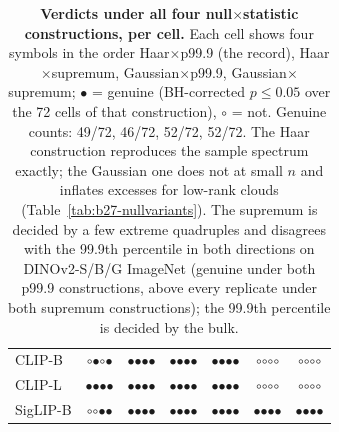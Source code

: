 \begin{table}[H]
\begin{tabular}{lcccccc}
\midrule
CLIP-B & $\circ$$\bullet$$\circ$$\bullet$ & $\bullet$$\bullet$$\bullet$$\bullet$ & $\bullet$$\bullet$$\bullet$$\bullet$ & $\bullet$$\bullet$$\bullet$$\bullet$ & $\circ$$\circ$$\circ$$\circ$ & $\circ$$\circ$$\circ$$\circ$ \\
CLIP-L & $\bullet$$\bullet$$\bullet$$\bullet$ & $\bullet$$\bullet$$\bullet$$\bullet$ & $\bullet$$\bullet$$\bullet$$\bullet$ & $\bullet$$\bullet$$\bullet$$\bullet$ & $\circ$$\circ$$\circ$$\circ$ & $\circ$$\circ$$\circ$$\circ$ \\
SigLIP-B & $\circ$$\circ$$\bullet$$\bullet$ & $\bullet$$\bullet$$\bullet$$\bullet$ & $\bullet$$\bullet$$\bullet$$\bullet$ & $\bullet$$\bullet$$\bullet$$\bullet$ & $\bullet$$\bullet$$\bullet$$\bullet$ & $\bullet$$\bullet$$\bullet$$\bullet$ \\
\bottomrule
\end{tabular}
\caption{\textbf{Verdicts under all four null$\times$statistic constructions, per cell.} Each cell shows four symbols in the order Haar$\times$p99.9 (the record), Haar$\times$supremum, Gaussian$\times$p99.9, Gaussian$\times$supremum; $\bullet$ = genuine (BH-corrected $p\le0.05$ over the 72 cells of that construction), $\circ$ = not. Genuine counts: 49/72, 46/72, 52/72, 52/72. The Haar construction reproduces the sample spectrum exactly; the Gaussian one does not at small $n$ and inflates excesses for low-rank clouds (Table~\ref{tab:b27-nullvariants}). The supremum is decided by a few extreme quadruples and disagrees with the 99.9th percentile in both directions on DINOv2-S/B/G ImageNet (genuine under both p99.9 constructions, above every replicate under both supremum constructions); the 99.9th percentile is decided by the bulk. %
}
\label{tab:b21-2x2}
\end{table}
